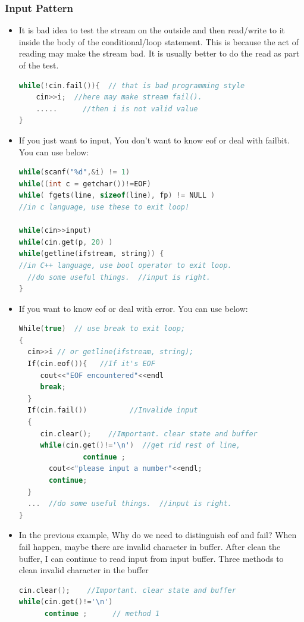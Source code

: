 \documentclass[a4paper,12pt,twoside]{book}
\begin{document}
\subsubsection{Input Pattern}

\begin{itemize}
\item It is bad idea to test the stream on the outside and then read/write to it inside the body of the conditional/loop statement. This is because the act of reading may make the stream bad. It is usually better to do the read as part of the test.

 \begin{lstlisting}[frame=single, language=c++]
while(!cin.fail()){  // that is bad programming style
    cin>>i;  //here may make stream fail().
    .....      //then i is not valid value
}
 \end{lstlisting}

\item If you just want to input, You don't want to know eof or deal with failbit. You can use below: \\

 \begin{lstlisting}[frame=single, language=c++]
while(scanf("%d",&i) != 1)
while((int c = getchar())!=EOF)
while( fgets(line, sizeof(line), fp) != NULL )
//in c language, use these to exit loop!

while(cin>>input)
while(cin.get(p, 20) )
while(getline(ifstream, string)) {
//in C++ language, use bool operator to exit loop.
  //do some useful things.  //input is right.
}
\end{lstlisting}

\item If you want to know eof or deal with error. You can use below:
\begin{lstlisting}[frame=single, language=c++]
While(true)  // use break to exit loop;
{
  cin>>i // or getline(ifstream, string);
  If(cin.eof()){   //If it's EOF
     cout<<"EOF encountered"<<endl
     break;
  }
  If(cin.fail())          //Invalide input
  {
     cin.clear();    //Important. clear state and buffer
     while(cin.get()!='\n')  //get rid rest of line,
               continue ;
       cout<<"please input a number"<<endl;
       continue;
  }
  ...  //do some useful things.  //input is right.
}
\end{lstlisting}




\item In the previous example, Why do we need to distinguish eof and fail? When fail happen, maybe there are invalid character in buffer. After clean the buffer, I can continue to read input from input buffer. Three methods to clean invalid character in the buffer
\begin{lstlisting}[frame=single, language=c++]
cin.clear();    //Important. clear state and buffer
while(cin.get()!='\n')
      continue ;      // method 1


\end{lstlisting}
\end{itemize}
\end{document}
